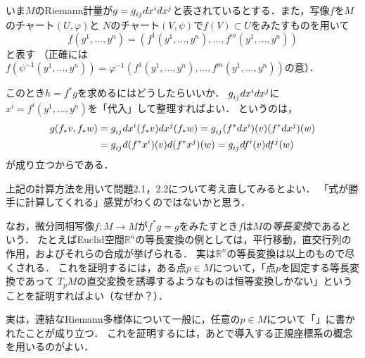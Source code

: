 \documentclass[uplatex,dvipdfmx,fontsize=12pt,jafontsize=11pt,line_length=42zw,number_of_lines=36,hanging_punctuation]{jlreq}
\begin{document}
いま$M$のRiemann計量が$g=\tensor{g}{_i_j}dx^idx^j$と表されているとする．また，写像$f$を$M$のチャート$(U,\varphi)$と
$N$のチャート$(V,\psi)$で$f(V)\subset U$をみたすものを用いて
\begin{equation}
	f(y^1,\dots,y^n)=(f^1(y^1,\dots,y^n),\dots,f^m(y^1,\dots,y^n))
\end{equation}
と表す
（正確には$f(\psi^{-1}(y^1,\dots,y^n))=\varphi^{-1}(f^1(y^1,\dots,y^n),\dots,f^m(y^1,\dots,y^n))$の意）．

このとき$h=f^*g$を求めるにはどうしたらいいか．
$\tensor{g}{_i_j}dx^idx^j$に$x^i=f^i(y^1,\dots,y^n)$を「代入」して整理すればよい．
というのは，
\begin{equation}
	\begin{split}
		g(f_*v,f_*w)
		&=\tensor{g}{_i_j}dx^i(f_*v)dx^j(f_*w)
		=\tensor{g}{_i_j}(f^*dx^i)(v)(f^*dx^j)(w) \\
		&=\tensor{g}{_i_j}d(f^*x^i)(v)d(f^*x^j)(w)
		=\tensor{g}{_i_j}df^i(v)df^j(w)
	\end{split}
\end{equation}
が成り立つからである．

上記の計算方法を用いて問題2.1，2.2について考え直してみるとよい．
「式が勝手に計算してくれる」感覚がわくのではないかと思う．

なお，微分同相写像$f\colon M\to M$が$f^*g=g$をみたすとき$f$は$M$の\emph{等長変換}であるという．
たとえばEuclid空間$\mathbb{R}^n$の等長変換の例としては，平行移動，直交行列の作用，およびそれらの合成が挙げられる．
実は$\mathbb{R}^n$の等長変換は以上のもので尽くされる．
これを証明するには，ある点$p\in M$について，「点$p$を固定する等長変換であって
$T_pM$の直交変換を誘導するようなものは恒等変換しかない」ということを証明すればよい（なぜか？）．

実は，連結なRiemann多様体について一般に，任意の$p\in M$について「」に書かれたことが成り立つ．
これを証明するには，あとで導入する正規座標系の概念を用いるのがよい．
\end{document}
